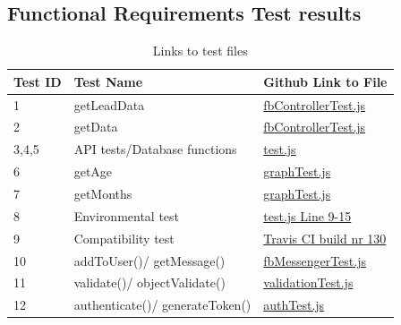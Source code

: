 \documentclass{article}
\begin{document}
\subsection{Functional Requirements Test results}
\begin{table}[H]
\centering
\label{link_table}
\begin{tabular}{|l|l|l|}
\hline
Test ID    & Test Name   & Github Link to File \\ \hline \hline
1          & getLeadData &  \href{https://github.com/QuintonWeenink/ValknutSolutions/blob/develop/test/integration/fbControllerTest.js}{fbControllerTest.js}         \\ \hline
2          & getData  &  \href{https://github.com/QuintonWeenink/ValknutSolutions/blob/develop/test/integration/fbControllerTest.js}{fbControllerTest.js}       \\ \hline
3,4,5      & API tests/Database functions & \href{https://github.com/QuintonWeenink/ValknutSolutions/blob/develop/test/api/test.js}{test.js}         \\ \hline
6          & getAge    & \href{https://github.com/QuintonWeenink/ValknutSolutions/blob/develop/test/graphTest.js}{graphTest.js} \\ \hline
7          & getMonths  & \href{https://github.com/QuintonWeenink/ValknutSolutions/blob/develop/test/graphTest.js}{graphTest.js} \\ \hline 
8          &  Environmental test  & \href{https://github.com/QuintonWeenink/ValknutSolutions/blob/develop/test/test.js}{test.js Line 9-15}\\ \hline
9		   & Compatibility test & \href{https://travis-ci.com/QuintonWeenink/ValknutSolutions/builds/30866212}{Travis CI build nr 130} \\ \hline
10		   & addToUser()/ getMessage() & \href{https://github.com/QuintonWeenink/ValknutSolutions/blob/develop/test/fbMessengerTest.js}{fbMessengerTest.js}   \\ \hline
11		   & validate()/ objectValidate() & \href{https://github.com/QuintonWeenink/ValknutSolutions/blob/develop/test/validationTest.js}{validationTest.js}   \\ \hline
12		   & authenticate()/ generateToken() & \href{https://github.com/QuintonWeenink/ValknutSolutions/blob/develop/test/authTest.js}{authTest.js}   \\ \hline
\end{tabular}
\caption{Links to test files}
\end{table}
\end{document}
